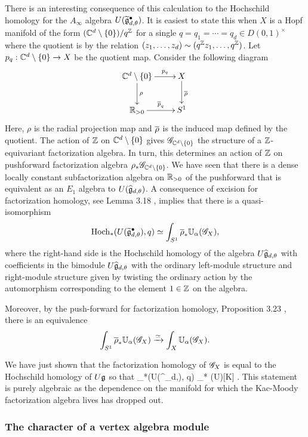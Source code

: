 There is an interesting consequence of this calculation to the Hochschild homology for the $A_\infty$ algebra $U(\Tilde{\fg}^\bullet_{d,\theta})$.
It is easiest to state this when $X$ is a Hopf manifold of the form $(\CC^d \setminus \{0\}) / q^\ZZ$ for a single $q =q_1=\cdots=q_d \in D(0,1)^\times$ where the quotient is by the relation $(z_1,\ldots,z_d) \sim (q^\ZZ z_1,\ldots,q^\ZZ)$.
Let $p_q :  \CC^d \setminus \{0\} \to X$ be the quotient map.
Consider the following diagram
\[
\xymatrix{
\CC^d \setminus \{0\} \ar[r]^-{p_q} \ar[d]^-{\rho} & X \ar[d]^{\Bar{\rho}} \\
\RR_{>0} \ar[r]^-{\Bar{p}_q} & S^1
}
\]
Here, $\rho$ is the radial projection map and $\Bar{\rho}$ is the induced map defined by the quotient.
The action of $\ZZ$ on $\CC^d \setminus\{0\}$ gives $\sG_{\CC^d \setminus \{0\}}$ the structure of a $\ZZ$-equivariant factorization algebra. 
In turn, this determines an action of $\ZZ$ on pushforward factorization algebra $\rho_* \sG_{\CC^d \setminus \{0\}}$.
We have seen that there is a dense locally constant subfactorization algebra on $\RR_{>0}$ of the pushforward that is equivalent as an $E_1$ algebra to $U(\Hat{\fg}_{d,\theta})$.
A consequence of excision for factorization homology, see Lemma 3.18 \cite{AFTopMan}, implies that there is a quasi-isomorphism
\[
\Hoch_*(U(\Tilde{\fg}^\bullet_{d,\theta}), q) \simeq \int_{S^1} \Bar{\rho}_* \UU_\alpha(\sG_X),
\]
where the right-hand side is the Hochschild homology of the algebra $U \Hat{\fg}_{d,\theta}$ with coefficients in the bimodule $U \Hat{\fg}_{d, \theta}$ with the ordinary left-module structure and right-module structure given by twisting the ordinary action by the automorphism corresponding to the element $1 \in \ZZ$ on the algebra.

Moreover, by the push-forward for factorization homology, Proposition 3.23 \cite{AFTopMan}, there is an equivalence
\[
\int_{S^1} \Bar{\rho}_* \UU_\alpha(\sG_X) \xto{\simeq} \int_X \UU_{\alpha} (\sG_X) .
\]

We have just shown that the factorization homology of $\sG_X$ is equal to the Hochschild homology of $U\fg$ so that
\beqn\label{hoch1}
\Hoch_*(U(\Tilde{\fg}^\bullet_{d,\theta}), q) \simeq \Hoch_* (U\fg)[K] .
\eeqn
This statement is purely algebraic as the dependence on the manifold for which the Kac-Moody factorization algebra lives has dropped out.

\subsubsection{The character of a vertex algebra module}

